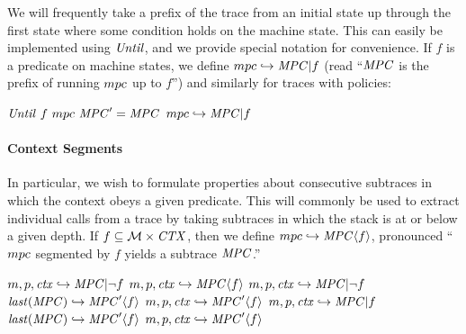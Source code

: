 \documentclass[acmsmall,review,anonymous]{acmart}\settopmatter{printfolios=true,printccs=false,printacmref=false}
\begin{document}

We will frequently take a prefix of the trace from an initial state up
through the first state where some condition holds on the machine state.
This can easily be implemented using \(\mathit{Until}\), and we provide special notation
for convenience.
%
If \(f\) is a predicate on machine states, we define \(mpc
\hookrightarrow \mathit{MPC} | f\) (read ``\(\mathit{MPC}\) is the prefix of
running \(mpc\) up to \(f\)'') and similarly for traces with policies:

\begin{center}
            {\(\mathit{Until} ~ f ~ mpc ~ \mathit{MPC}' = \mathit{MPC}\)}
            {\(mpc \hookrightarrow \mathit{MPC} | f\)}
\end{center}

\paragraph*{Context Segments}

In particular, we wish to formulate properties about consecutive subtraces
in which the context obeys a given predicate. This will commonly be used to extract
individual calls from a trace by taking subtraces in which the stack is
at or below a given depth. If \(f \subseteq {\mathcal M} \times \mathit{CTX}\), then
we define \(mpc \hookrightarrow \mathit{MPC} \langle f \rangle\), pronounced
``\(mpc\) segmented by \(f\) yields a subtrace \(\mathit{MPC}\).''

\begin{center}
              {\(m,p,\mathit{ctx} \hookrightarrow \mathit{MPC} | \neg f\)}
              {\(m,p,\mathit{ctx} \hookrightarrow \mathit{MPC} \langle f \rangle\)}
%
                {\(m,p,\mathit{ctx} \hookrightarrow \mathit{MPC} | \neg f\)}
                {\(\mathit{last}(\mathit{MPC}) \hookrightarrow \mathit{MPC}' \langle f \rangle\)}
                {\(m,p,\mathit{ctx} \hookrightarrow \mathit{MPC}' \langle f \rangle\)}
%
                {\(m,p,\mathit{ctx} \hookrightarrow \mathit{MPC} | f\)}
                {\(\mathit{last}(\mathit{MPC}) \hookrightarrow \mathit{MPC}' \langle f \rangle\)}
                {\(m,p,\mathit{ctx} \hookrightarrow \mathit{MPC}' \langle f \rangle\)}
\end{center}
\end{document}
